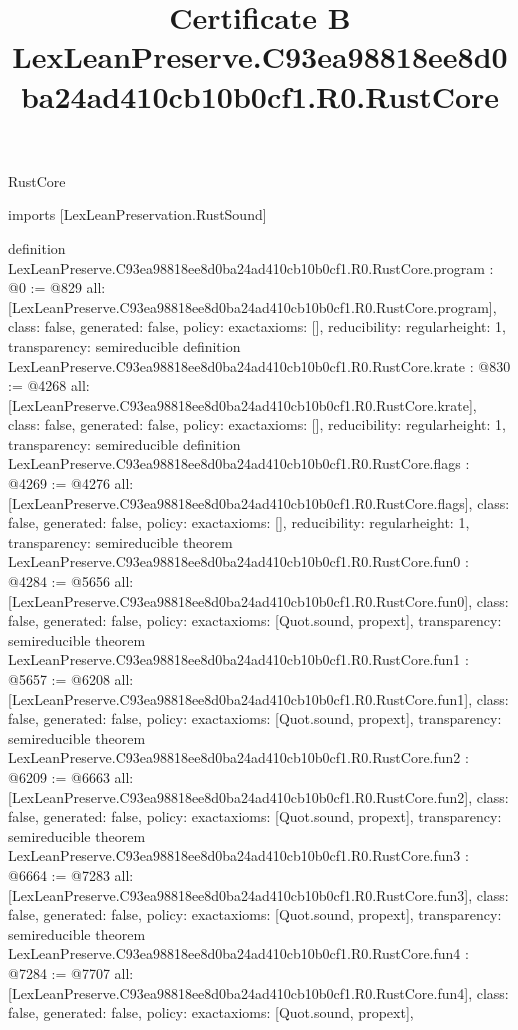 \begin{lexlean}{RustCore}
\title{Certificate B LexLeanPreserve.C93ea98818ee8d0ba24ad410cb10b0cf1.R0.RustCore}
\begin{coremodule}
imports [LexLeanPreservation.RustSound]

definition LexLeanPreserve.C93ea98818ee8d0ba24ad410cb10b0cf1.R0.RustCore.program : @0 := @829 {
  all: [LexLeanPreserve.C93ea98818ee8d0ba24ad410cb10b0cf1.R0.RustCore.program],
  class: false,
  generated: false,
  policy: exact{axioms: []},
  reducibility: regular{height: 1},
  transparency: semireducible
}
definition LexLeanPreserve.C93ea98818ee8d0ba24ad410cb10b0cf1.R0.RustCore.krate : @830 := @4268 {
  all: [LexLeanPreserve.C93ea98818ee8d0ba24ad410cb10b0cf1.R0.RustCore.krate],
  class: false,
  generated: false,
  policy: exact{axioms: []},
  reducibility: regular{height: 1},
  transparency: semireducible
}
definition LexLeanPreserve.C93ea98818ee8d0ba24ad410cb10b0cf1.R0.RustCore.flags : @4269 := @4276 {
  all: [LexLeanPreserve.C93ea98818ee8d0ba24ad410cb10b0cf1.R0.RustCore.flags],
  class: false,
  generated: false,
  policy: exact{axioms: []},
  reducibility: regular{height: 1},
  transparency: semireducible
}
theorem LexLeanPreserve.C93ea98818ee8d0ba24ad410cb10b0cf1.R0.RustCore.fun0 : @4284 := @5656 {
  all: [LexLeanPreserve.C93ea98818ee8d0ba24ad410cb10b0cf1.R0.RustCore.fun0],
  class: false,
  generated: false,
  policy: exact{axioms: [Quot.sound, propext]},
  transparency: semireducible
}
theorem LexLeanPreserve.C93ea98818ee8d0ba24ad410cb10b0cf1.R0.RustCore.fun1 : @5657 := @6208 {
  all: [LexLeanPreserve.C93ea98818ee8d0ba24ad410cb10b0cf1.R0.RustCore.fun1],
  class: false,
  generated: false,
  policy: exact{axioms: [Quot.sound, propext]},
  transparency: semireducible
}
theorem LexLeanPreserve.C93ea98818ee8d0ba24ad410cb10b0cf1.R0.RustCore.fun2 : @6209 := @6663 {
  all: [LexLeanPreserve.C93ea98818ee8d0ba24ad410cb10b0cf1.R0.RustCore.fun2],
  class: false,
  generated: false,
  policy: exact{axioms: [Quot.sound, propext]},
  transparency: semireducible
}
theorem LexLeanPreserve.C93ea98818ee8d0ba24ad410cb10b0cf1.R0.RustCore.fun3 : @6664 := @7283 {
  all: [LexLeanPreserve.C93ea98818ee8d0ba24ad410cb10b0cf1.R0.RustCore.fun3],
  class: false,
  generated: false,
  policy: exact{axioms: [Quot.sound, propext]},
  transparency: semireducible
}
theorem LexLeanPreserve.C93ea98818ee8d0ba24ad410cb10b0cf1.R0.RustCore.fun4 : @7284 := @7707 {
  all: [LexLeanPreserve.C93ea98818ee8d0ba24ad410cb10b0cf1.R0.RustCore.fun4],
  class: false,
  generated: false,
  policy: exact{axioms: [Quot.sound, propext]},
}
\end{coremodule}
\end{lexlean}
